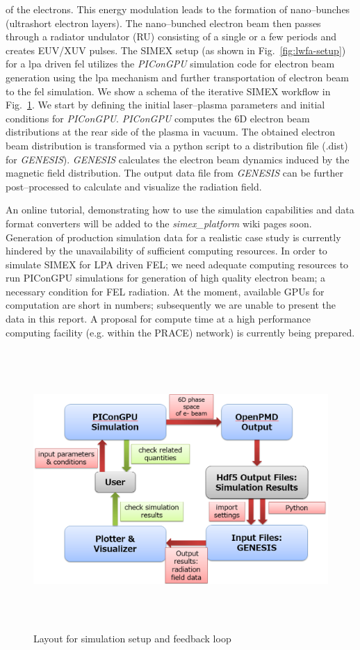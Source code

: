 of the electrons. This energy modulation leads to the formation of nano--bunches
(ultrashort electron layers). The nano--bunched electron beam then passes through
a radiator undulator (RU) consisting of a single or a few periods and creates
EUV/XUV pulses.
%
The SIMEX setup (as shown in Fig.~\ref{fig:lwfa-setup}) for a \gls{lpa} driven \gls{fel}
utilizes the \textit{PIConGPU} simulation code for electron beam generation using the \gls{lpa}
mechanism and further transportation of electron beam to the \gls{fel} simulation.
We show a schema of the iterative SIMEX workflow in
Fig.~\ref{fig:lwfa-simulation_loop}. We start by defining the initial laser--plasma
parameters and initial conditions for \textit{PIConGPU}.
\textit{PIConGPU} computes the 6D electron beam distributions at the rear
side of the plasma in vacuum. The obtained electron beam distribution is
transformed via a python script to a distribution file (.dist) for
\textit{GENESIS}). \textit{GENESIS} calculates the electron beam dynamics
induced by the magnetic field distribution. The output data file from
\textit{GENESIS} can be further post--processed to calculate and visualize the radiation
field.

An online tutorial, demonstrating how to use the simulation capabilities and
data format converters will be added to the \textit{simex\_platform} wiki pages
soon. Generation of production simulation data for a realistic case study
is currently hindered by the unavailability of sufficient computing resources.
In order to simulate SIMEX for LPA driven FEL; we need adequate computing resources to run PIConGPU simulations for generation of high quality electron beam; a necessary condition for FEL radiation. At the moment, available GPUs for computation are short in numbers; subsequently we are unable to present the data in this report. A
proposal for compute time at a high performance computing facility (e.g. within the
PRACE) network) is currently being prepared.
\begin{figure}[ht]
  \begin{center}%
    \includegraphics[width=5.9425in,height=4.1882in]{figures/lwfafel-img002.png}
    \caption{Layout for simulation setup and feedback loop}
    \label{fig:lwfa-simulation_loop}
  \end{center}%
\end{figure}
%
